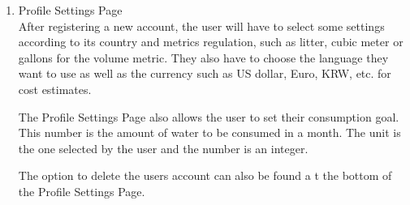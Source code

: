 \documentclass[10pt]{article}
\begin{document}
\begin{enumerate}
  \item {Profile Settings Page} \\
  After registering a new account, the user will have to select some settings according to its country and metrics regulation, such as litter, cubic meter or gallons for the volume metric. They also have to choose the language they want to use as well as the currency such as US dollar, Euro, KRW, etc. for cost estimates.

  The Profile Settings Page also allows the user to set their consumption goal. This number is the amount of water to be consumed in a month. The unit is the one selected by the user and the number is an integer.

  The option to delete the users account can also be found a t the bottom of the Profile Settings Page.


\end{enumerate}
\end{document}
